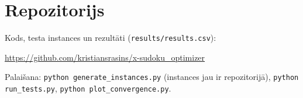 \documentclass[11pt,a4paper]{article}
\begin{document}
\section{Repozitorijs}

Kods, testa instances un rezultāti (\texttt{results/results.csv}):

\url{https://github.com/kristiansrasins/x-sudoku_optimizer}

Palaišana: \texttt{python generate\_instances.py} (instances jau ir repozitorijā),
\texttt{python run\_tests.py}, \texttt{python plot\_convergence.py}.
\end{document}

